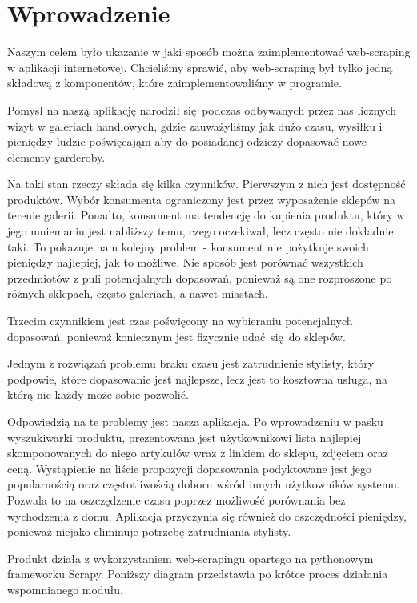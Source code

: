 \chapter{Wprowadzenie}

Naszym celem było ukazanie w jaki sposób można zaimplementować web-scraping w aplikacji internetowej. Chcieliśmy sprawić, aby web-scraping był tylko jedną składową z komponentów, które zaimplementowaliśmy w programie.

Pomysł na naszą aplikację narodził się podczas odbywanych przez nas licznych wizyt w galeriach handlowych, gdzie zauważyliśmy jak dużo czasu, wysiłku i pieniędzy ludzie poświęcająm aby do posiadanej odzieży dopasować nowe elementy garderoby.

Na taki stan rzeczy składa się kilka czynników. Pierwszym z nich jest dostępność produktów. Wybór konsumenta ograniczony jest przez wyposażenie sklepów na terenie galerii. Ponadto, konsument ma tendencję do kupienia produktu, który w jego mniemaniu jest nabliższy temu, czego oczekiwał, lecz często nie dokładnie taki. To pokazuje nam kolejny problem - konsument nie pożytkuje swoich pieniędzy najlepiej, jak to możliwe. Nie sposób jest porównać wszystkich przedmiotów z puli potencjalnych dopasowań, ponieważ są one rozproszone po różnych sklepach, często galeriach, a nawet miastach. 

Trzecim czynnikiem jest czas poświęcony na wybieraniu potencjalnych dopasowań, ponieważ koniecznym jest fizycznie udać się do sklepów.

Jednym z rozwiązań problemu braku czasu jest zatrudnienie stylisty, który podpowie, które dopasowanie jest najlepsze, lecz jest to kosztowna usługa, na którą nie każdy może sobie pozwolić.

Odpowiedzią na te problemy jest nasza aplikacja. Po wprowadzeniu w pasku wyszukiwarki produktu, prezentowana jest użytkownikowi lista najlepiej skomponowanych do niego artykułów wraz z linkiem do sklepu, zdjęciem oraz ceną.
Wystąpienie na liście propozycji dopasowania podyktowane jest jego popularnością oraz częstotliwością doboru wśród innych użytkowników systemu.
Pozwala to na oszczędzenie czasu poprzez możliwość porównania bez wychodzenia z domu.
Aplikacja przyczynia się również do oszczędności pieniędzy, ponieważ niejako eliminuje potrzebę zatrudniania stylisty.

Produkt działa z wykorzystaniem web-scrapingu opartego na pythonowym frameworku Scrapy.
Poniższy diagram przedstawia po krótce proces działania wspomnianego modułu.


